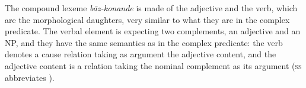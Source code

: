 \documentclass[output=paper
                ,modfonts
                ,nonflat
	        ,collection
	        ,collectionchapter
	        ,collectiontoclongg
 	        ,biblatex
                ,babelshorthands
                ,newtxmath
                ,draftmode
                ,colorlinks, citecolor=brown
]{./langsci/langscibook}
\begin{document}
{\begin{exe}
\end{exe}

The compound lexeme \emph{b\=az-konande} is made of the adjective and the verb, which are the morphological daughters, very similar to what they are in the complex predicate. The verbal element is expecting two complements, an adjective and an NP, and they have the same semantics as in the complex predicate: the verb denotes a cause relation taking as argument the adjective content, and the adjective content is a relation taking the nominal complement as its argument (\textsc{ss} abbreviates \synsem). 

}
\end{document}
